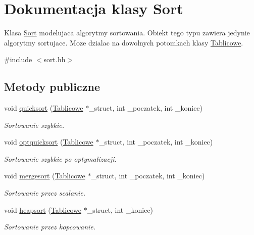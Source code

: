 \hypertarget{class_sort}{\section{Dokumentacja klasy Sort}
\label{class_sort}
}


Klasa \hyperlink{class_sort}{Sort} modelujaca algorytmy sortowania. Obiekt tego typu zawiera jedynie algorytmy sortujace. Moze dzialac na dowolnych potomkach klasy \hyperlink{class_tablicowe}{Tablicowe}.  




{\ttfamily \#include $<$sort.\-hh$>$}

\subsection*{Metody publiczne}
\begin{DoxyCompactItemize}
\item 
void \hyperlink{class_sort_a99466573f1c56069f8d0f0409584f223}{quicksort} (\hyperlink{class_tablicowe}{Tablicowe} $\ast$\-\_\-struct, int \-\_\-poczatek, int \-\_\-koniec)
\begin{DoxyCompactList}\small\item\em Sortowanie szybkie. \end{DoxyCompactList}\item 
void \hyperlink{class_sort_a47f0b25ca3c2fb896546f078400e42a1}{optquicksort} (\hyperlink{class_tablicowe}{Tablicowe} $\ast$\-\_\-struct, int \-\_\-poczatek, int \-\_\-koniec)
\begin{DoxyCompactList}\small\item\em Sortowanie szybkie po optymalizacji. \end{DoxyCompactList}\item 
void \hyperlink{class_sort_a787ba6b1508df5bc6ef01caf365b92dd}{mergesort} (\hyperlink{class_tablicowe}{Tablicowe} $\ast$\-\_\-struct, int \-\_\-poczatek, int \-\_\-koniec)
\begin{DoxyCompactList}\small\item\em Sortowanie przez scalanie. \end{DoxyCompactList}\item 
void \hyperlink{class_sort_a396694c4ddd43032bfe5c8434e59e896}{heapsort} (\hyperlink{class_tablicowe}{Tablicowe} $\ast$\-\_\-struct, int \-\_\-koniec)
\begin{DoxyCompactList}\small\item\em Sortowanie przez kopcowanie. \end{DoxyCompactList}\end{DoxyCompactItemize}
